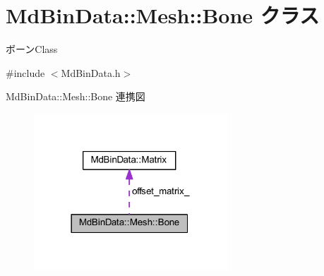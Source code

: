 \hypertarget{class_md_bin_data_1_1_mesh_1_1_bone}{}\section{Md\+Bin\+Data\+:\+:Mesh\+:\+:Bone クラス}
\label{class_md_bin_data_1_1_mesh_1_1_bone}


ボーン\+Class  




{\ttfamily \#include $<$Md\+Bin\+Data.\+h$>$}



Md\+Bin\+Data\+:\+:Mesh\+:\+:Bone 連携図
\nopagebreak
\begin{figure}[H]
\begin{center}
\leavevmode
\includegraphics[width=206pt]{class_md_bin_data_1_1_mesh_1_1_bone__coll__graph}
\end{center}
\end{figure}
